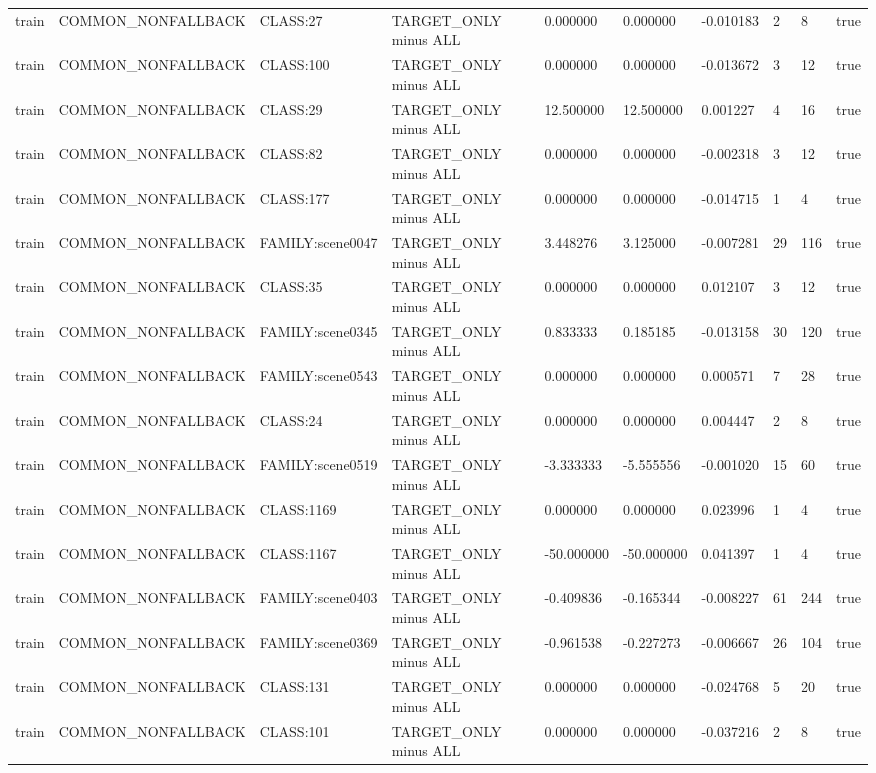 \begin{tabular}{llllllllll}
train & COMMON\_NONFALLBACK & CLASS:27 & TARGET\_ONLY minus ALL & 0.000000 & 0.000000 & -0.010183 & 2 & 8 & true \\
train & COMMON\_NONFALLBACK & CLASS:100 & TARGET\_ONLY minus ALL & 0.000000 & 0.000000 & -0.013672 & 3 & 12 & true \\
train & COMMON\_NONFALLBACK & CLASS:29 & TARGET\_ONLY minus ALL & 12.500000 & 12.500000 & 0.001227 & 4 & 16 & true \\
train & COMMON\_NONFALLBACK & CLASS:82 & TARGET\_ONLY minus ALL & 0.000000 & 0.000000 & -0.002318 & 3 & 12 & true \\
train & COMMON\_NONFALLBACK & CLASS:177 & TARGET\_ONLY minus ALL & 0.000000 & 0.000000 & -0.014715 & 1 & 4 & true \\
train & COMMON\_NONFALLBACK & FAMILY:scene0047 & TARGET\_ONLY minus ALL & 3.448276 & 3.125000 & -0.007281 & 29 & 116 & true \\
train & COMMON\_NONFALLBACK & CLASS:35 & TARGET\_ONLY minus ALL & 0.000000 & 0.000000 & 0.012107 & 3 & 12 & true \\
train & COMMON\_NONFALLBACK & FAMILY:scene0345 & TARGET\_ONLY minus ALL & 0.833333 & 0.185185 & -0.013158 & 30 & 120 & true \\
train & COMMON\_NONFALLBACK & FAMILY:scene0543 & TARGET\_ONLY minus ALL & 0.000000 & 0.000000 & 0.000571 & 7 & 28 & true \\
train & COMMON\_NONFALLBACK & CLASS:24 & TARGET\_ONLY minus ALL & 0.000000 & 0.000000 & 0.004447 & 2 & 8 & true \\
train & COMMON\_NONFALLBACK & FAMILY:scene0519 & TARGET\_ONLY minus ALL & -3.333333 & -5.555556 & -0.001020 & 15 & 60 & true \\
train & COMMON\_NONFALLBACK & CLASS:1169 & TARGET\_ONLY minus ALL & 0.000000 & 0.000000 & 0.023996 & 1 & 4 & true \\
train & COMMON\_NONFALLBACK & CLASS:1167 & TARGET\_ONLY minus ALL & -50.000000 & -50.000000 & 0.041397 & 1 & 4 & true \\
train & COMMON\_NONFALLBACK & FAMILY:scene0403 & TARGET\_ONLY minus ALL & -0.409836 & -0.165344 & -0.008227 & 61 & 244 & true \\
train & COMMON\_NONFALLBACK & FAMILY:scene0369 & TARGET\_ONLY minus ALL & -0.961538 & -0.227273 & -0.006667 & 26 & 104 & true \\
train & COMMON\_NONFALLBACK & CLASS:131 & TARGET\_ONLY minus ALL & 0.000000 & 0.000000 & -0.024768 & 5 & 20 & true \\
train & COMMON\_NONFALLBACK & CLASS:101 & TARGET\_ONLY minus ALL & 0.000000 & 0.000000 & -0.037216 & 2 & 8 & true \\

\end{tabular}
